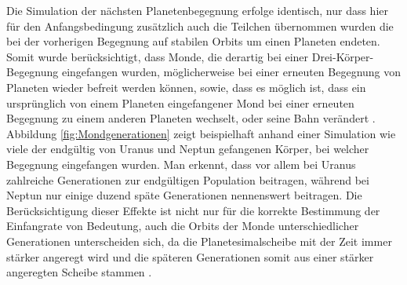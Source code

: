 \documentclass[12pt,a4paper,twoside,open=right,bibliography=totoc]{scrbook}
\renewcommand{\cite}{ \citep}
\begin{document}
Die Simulation der nächsten Planetenbegegnung erfolge identisch, nur dass hier für den Anfangsbedingung zusätzlich auch die Teilchen übernommen wurden die bei der vorherigen Begegnung auf stabilen Orbits um einen Planeten endeten.
Somit wurde berücksichtigt, dass Monde, die derartig bei einer Drei-Körper-Begegnung eingefangen wurden, möglicherweise bei einer erneuten Begegnung von Planeten wieder befreit werden können, sowie, dass es möglich ist, dass ein ursprünglich von einem Planeten eingefangener Mond bei einer erneuten Begegnung zu einem anderen Planeten wechselt, oder seine Bahn verändert\cite{Nesvorny2007}.
Abbildung \ref{fig:Mondgenerationen} zeigt beispielhaft anhand einer Simulation wie viele der endgültig von Uranus und Neptun gefangenen Körper, bei welcher Begegnung eingefangen wurden.
Man erkennt, dass vor allem bei Uranus zahlreiche Generationen zur endgültigen Population beitragen, während bei Neptun nur einige duzend späte Generationen nennenswert beitragen.
Die Berücksichtigung dieser Effekte ist nicht nur für die korrekte Bestimmung der Einfangrate von Bedeutung, auch die Orbits der Monde unterschiedlicher Generationen unterscheiden sich, da die Planetesimalscheibe mit der Zeit immer stärker angeregt wird und die späteren Generationen somit aus einer stärker angeregten Scheibe stammen\cite{Nesvorny2007}.
\end{document}
